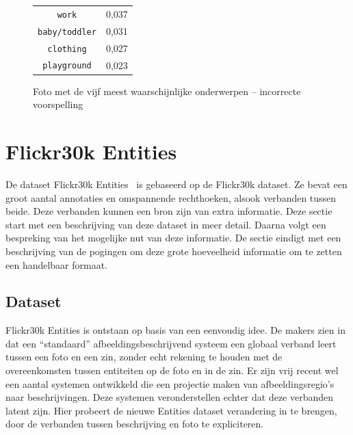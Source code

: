 \begin{figure}[h]
\begin{minipage}[t]{.5\textwidth}
\begin{tabular}{cl}
            \texttt{work}                   & 0,037 \\
            \texttt{baby/toddler}                 & 0,031 \\
            \texttt{clothing}           & 0,027 \\
            \texttt{playground}        & 0,023\\
            \hline
        \end{tabular}
    \end{minipage}
    \caption{Foto met de vijf meest waarschijnlijke onderwerpen -- incorrecte voorspelling}
    \label{fig:wrongldalearning}
\end{figure}


\section{Flickr30k Entities}
De dataset Flickr30k Entities~\cite{Plummer2015} is gebaseerd op de Flickr30k dataset. Ze bevat een groot aantal annotaties en omspannende rechthoeken, alsook verbanden tussen beide. Deze verbanden kunnen een bron zijn van extra informatie. Deze sectie start met een beschrijving van deze dataset in meer detail. Daarna volgt een bespreking van het mogelijke nut van deze informatie. De sectie eindigt met een beschrijving van de pogingen om deze grote hoeveelheid informatie om te zetten een handelbaar formaat. 

\subsection{Dataset}
\label{sub:Dataset}
Flickr30k Entities is ontstaan op basis van een eenvoudig idee. De makers zien in dat een ``standaard'' afbeeldingsbeschrijvend systeem een globaal verband leert tussen een foto en een zin, zonder echt rekening te houden met de overeenkomsten tussen entiteiten op de foto en in de zin. Er zijn vrij recent wel een aantal systemen ontwikkeld die een projectie maken van afbeeldingsregio's naar beschrijvingen. Deze systemen veronderstellen echter dat deze verbanden latent zijn. Hier probeert de nieuwe Entities dataset verandering in te brengen, door de verbanden tussen beschrijving en foto te expliciteren.

